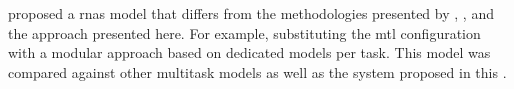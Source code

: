 
\textcite{mcleod2021modular} proposed a \glspl{rna} model
that differs from the methodologies presented by
\textcite{chen2021attend}, \textcite{micchi2021deep}, and
the approach presented here. For example, substituting the
\gls{mtl} configuration with a modular approach based on
dedicated models per task. This model was compared against
other multitask models as well as the system proposed in
this \thesisdiss{}.
